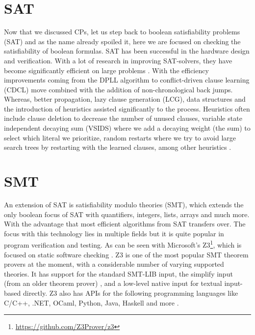 \section{SAT}
\label{CS:SAT}
Now that we discussed CPs, let us step back to boolean satisfiability problems (SAT) and as the name already spoiled it, here we are focused on checking the satisfiability of boolean formulas. SAT has been successful in the hardware design and verification. With a lot of research in improving SAT-solvers, they have become significantly efficient on large problems \cite{56bardin2019bringing}.
With the efficiency improvements coming from the DPLL algorithm to conflict-driven clause learning (CDCL) move combined with the addition of non-chronological back jumps. Whereas, better propagation, lazy clause generation (LCG), data structures and the introduction of heuristics assisted significantly to the process. Heuristics often include clause deletion to decrease the number of unused clauses, variable state independent decaying sum (VSIDS) where we add a decaying weight (the sum) to select which literal we prioritize, random restarts where we try to avoid large search trees by restarting with the learned clauses, among other heuristics \cite{61MCSMarcDenecker, 60katebi2011empirical, 67stuckey2010lazyClauseGeneration}.



\section{SMT}
\label{CS:SMT}
An extension of SAT is satisfiability modulo theories (SMT), which extends the only boolean focus of SAT with quantifiers, integers, lists, arrays and much more. With the advantage that most efficient algorithms from SAT transfers over. The focus with this technology lies in multiple fields but it is quite popular in program verification and testing. As can be seen with Microsoft’s Z3\footnote{\url{https://github.com/Z3Prover/z3}}, which is focused on static software checking \cite{54moura2008z3}. Z3 is one of the most popular SMT theorem provers at the moment, with a considerable number of varying supported theories. It has support for the standard SMT-LIB input, the simplify input (from an older theorem prover) \cite{73detlefs2005simplify}, and a low-level native input for textual input-based directly. Z3 also has APIs for the following programming languages like C/C++, .NET, OCaml, Python, Java, Haskell and more \cite{64WikiSMT}.

